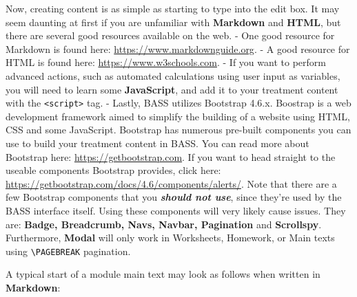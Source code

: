\documentclass[
]{book}
\begin{document}
Now, creating content is as simple as starting to type into the edit box. It may seem daunting at first if you are unfamiliar with \textbf{Markdown} and \textbf{HTML}, but there are several good resources available on the web.
- One good resource for Markdown is found here: \url{https://www.markdownguide.org}.
- A good resource for HTML is found here: \url{https://www.w3schools.com}.
- If you want to perform advanced actions, such as automated calculations using user input as variables, you will need to learn some \textbf{JavaScript}, and add it to your treatment content with the \texttt{\textless{}script\textgreater{}} tag.
- Lastly, BASS utilizes Bootstrap 4.6.x. Boostrap is a web development framework aimed to simplify the building of a website using HTML, CSS and some JavaScript. Bootstrap has numerous pre-built components you can use to build your treatment content in BASS. You can read more about Bootstrap here: \url{https://getbootstrap.com}. If you want to head straight to the useable components Bootstrap provides, click here: \url{https://getbootstrap.com/docs/4.6/components/alerts/}.
Note that there are a few Bootstrap components that you \textbf{\emph{should not use}}, since they're used by the BASS interface itself. Using these components will very likely cause issues. They are: \textbf{Badge, Breadcrumb, Navs, Navbar, Pagination} and \textbf{Scrollspy}. Furthermore, \textbf{Modal} will only work in Worksheets, Homework, or Main texts using \texttt{\textbackslash{}PAGEBREAK} pagination.

A typical start of a module main text may look as follows when written in \textbf{Markdown}:
\end{document}
